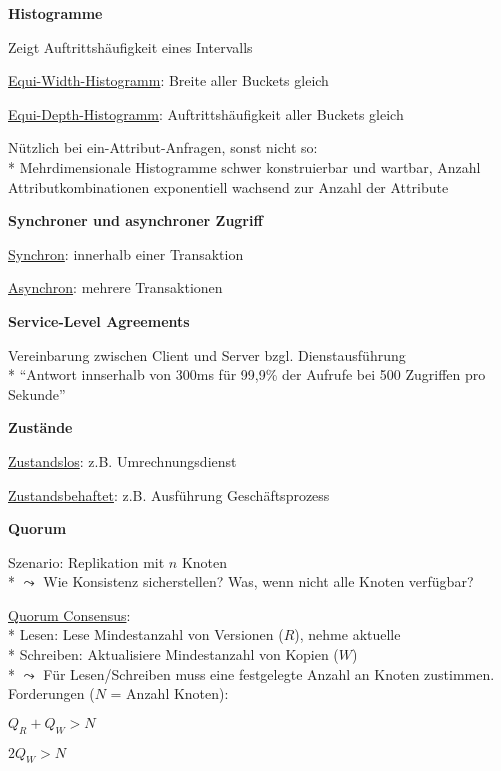 \textbf{Histogramme}
\begin{items}
	\item Zeigt Auftrittshäufigkeit eines Intervalls
	\item \underline{Equi-Width-Histogramm}: Breite aller Buckets gleich
	\item \underline{Equi-Depth-Histogramm}: Auftrittshäufigkeit aller Buckets gleich
	\item Nützlich bei ein-Attribut-Anfragen, sonst nicht so:
		\\*
		Mehrdimensionale Histogramme schwer konstruierbar und wartbar, Anzahl Attributkombinationen exponentiell wachsend zur Anzahl der Attribute
\end{items}

\textbf{Synchroner und asynchroner Zugriff}
\begin{items}
	\item \underline{Synchron}: innerhalb einer Transaktion
	\item \underline{Asynchron}: mehrere Transaktionen
\end{items}

\textbf{Service-Level Agreements}
\begin{items}
	\item Vereinbarung zwischen Client und Server bzgl. Dienstausführung
		\\*
		``Antwort innserhalb von 300ms für 99,9\% der Aufrufe bei 500 Zugriffen pro Sekunde''
\end{items}

\textbf{Zustände}
\begin{items}
	\item \underline{Zustandslos}: z.B. Umrechnungsdienst
	\item \underline{Zustandsbehaftet}: z.B. Ausführung Geschäftsprozess
\end{items}

\textbf{Quorum}
\begin{items}
	\item Szenario: Replikation mit \( n \) Knoten
		\\*
		\( \leadsto \) Wie Konsistenz sicherstellen? Was, wenn nicht alle Knoten verfügbar?
	\item \underline{Quorum Consensus}:
		\\*
		Lesen: Lese Mindestanzahl von Versionen (\( R \)), nehme aktuelle
		\\*
		Schreiben: Aktualisiere Mindestanzahl von Kopien (\( W \))
		\\*
		\( \leadsto \) Für Lesen/Schreiben muss eine festgelegte Anzahl an Knoten zustimmen. Forderungen (\( N \) = Anzahl Knoten):
		\begin{enumeration}
			\item \( Q_R+Q_W > N \)
			\item \( 2Q_W > N \)
		\end{enumeration}
\end{items}

